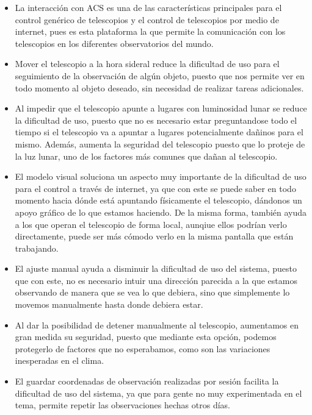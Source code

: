 \documentclass[letterpaper,spanish,10pt]{article}
\begin{document}
\begin{itemize}
\begin{itemize}
\item La interacci\'on con ACS es una de las caracter\'isticas principales para el control gen\'erico de telescopios y el control de telescopios por medio de internet, pues es esta plataforma la que permite la comunicaci\'on con los telescopios en los diferentes observatorios del mundo.

\item Mover el telescopio a la hora sideral reduce la dificultad de uso para el seguimiento de la observaci\'on de alg\'un objeto, puesto que nos permite ver en todo momento al objeto deseado, sin necesidad de realizar tareas adicionales.

\item Al impedir que el telescopio apunte a lugares con luminosidad lunar se reduce la dificultad de uso, puesto que no es necesario estar preguntandose todo el tiempo si el telescopio va a apuntar a lugares potencialmente da\~ninos para el mismo. Adem\'as, aumenta la seguridad del telescopio puesto que lo proteje de la luz lunar, uno de los factores m\'as comunes que da\~nan al telescopio.

\item El modelo visual soluciona un aspecto muy importante de la dificultad de uso para el control a trav\'es de internet, ya que con este se puede saber en todo momento hacia d\'onde est\'a apuntando f\'isicamente el telescopio, d\'andonos un apoyo gr\'afico de lo que estamos haciendo. De la misma forma, tambi\'en ayuda a los que operan el telescopio de forma local, aunqiue ellos podr\'ian verlo directamente, puede ser m\'as c\'omodo verlo en la misma pantalla que est\'an trabajando.

\item El ajuste manual ayuda a disminuir la dificultad de uso del sistema, puesto que con este, no es necesario intuir una direcci\'on parecida a la que estamos observando de manera que se vea lo que debiera, sino que simplemente lo movemos manualmente hasta donde debiera estar.

\item Al dar la posibilidad de detener manualmente al telescopio, aumentamos en gran medida su seguridad, puesto que mediante esta opci\'on, podemos protegerlo de factores que no esperabamos, como son las variaciones inesperadas en el clima. 

\item El guardar coordenadas de observaci\'on realizadas por sesi\'on facilita la dificultad de uso del sistema, ya que para gente no muy experimentada en el tema, permite repetir las observaciones hechas otros d\'ias.

\end{itemize}
\end{itemize}
\end{document}
